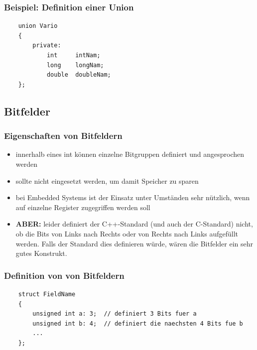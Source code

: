 \subsubsection{Beispiel: Definition einer Union}
\label{sec:Beispiel: Definition einer Union}
\noindent
\begin{minipage}{\linewidth}
	\begin{lstlisting}
	union Vario
	{
		private:
			int 	intNam;
			long	longNam;
			double	doubleNam;
	};
	\end{lstlisting}
\end{minipage}


\subsection{Bitfelder}
\label{sec:Bitfelder}

\subsubsection{Eigenschaften von Bitfeldern}
\label{sec:Eigenschaften von Bitfeldern}
\begin{itemize}
	\item innerhalb eines int können einzelne Bitgruppen definiert und angesprochen werden
	\item sollte nicht eingesetzt werden, um damit Speicher zu sparen
	\item bei Embedded Systems ist der Einsatz unter Umständen sehr nützlich, wenn auf einzelne Register zugegriffen werden soll
	\item \textbf{ABER:} leider definiert der C++-Standard (und auch der C-Standard) nicht, ob die Bits von Links nach Rechts oder von Rechts nach Links aufgefüllt werden. Falls der Standard dies definieren würde, wären die Bitfelder ein sehr gutes Konstrukt.
\end{itemize}

\subsubsection{Definition von von Bitfeldern}
\label{sec:Definitionvon von Bitfeldern}
\noindent
\begin{minipage}{\linewidth}
	\begin{lstlisting}
	struct FieldName
	{
		unsigned int a: 3;	// definiert 3 Bits fuer a
		unsigned int b: 4;	// definiert die naechsten 4 Bits fue b
		...
	};
	\end{lstlisting}
\end{minipage}

